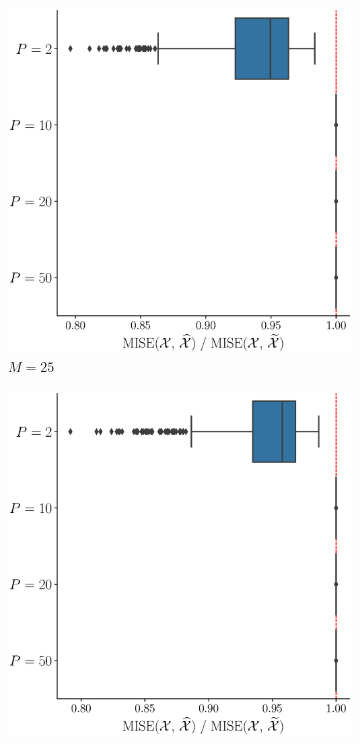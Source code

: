 \begin{results}


\begin{figure}
     \centering
     \begin{subfigure}[b]{0.49\textwidth}
         \centering
         \includegraphics[width=\textwidth]{figures/scenario_1/mise_N50_M25.eps}
         \caption{$M = 25$}
         \label{fig:mise_mfd_1d_25}
     \end{subfigure}
     \hfill
     \begin{subfigure}[b]{0.49\textwidth}
         \centering
         \includegraphics[width=\textwidth]{figures/scenario_1/mise_N50_M50.eps}

\end{subfigure}
\end{figure}
\end{results}
